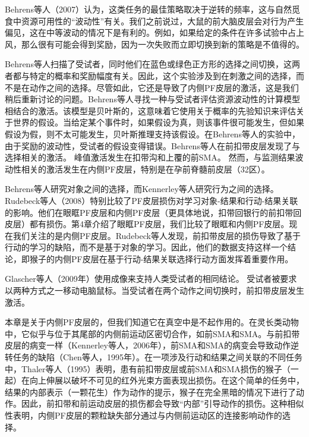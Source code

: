Behrens等人（2007）认为，这类任务的最佳策略取决于逆转的频率，这与自然觅食中资源可用性的“波动性”有关。我们之前说过，大鼠的前大脑皮层会对行为产生偏见，这在中等波动的情况下是有利的。例如，如果给定的条件在许多试验中占上风，那么很有可能会得到奖励，因为一次失败而立即切换到新的策略是不值得的。\par
Behrens等人扫描了受试者，同时他们在蓝色或绿色正方形的选择之间切换，这两者都与特定的概率和奖励幅度有关。因此，这个实验涉及到在刺激之间的选择，而不是在动作之间的选择。尽管如此，它还是导致了内侧PF皮层的激活，这是我们稍后重新讨论的问题。Behrens等人寻找一种与受试者评估资源波动性的计算模型相结合的激活。该模型是贝叶斯的，这意味着它使用关于概率的先验知识来评估关于世界的假设。当给定某个事件时，如果假设为真，则该事件很可能发生，但如果假设为假，则不太可能发生，贝叶斯推理支持该假设。在Behrens等人的实验中，由于奖励的波动性，受试者的假设变得错误。Behrens等人在前扣带皮层发现了与选择相关的激活。
峰值激活发生在扣带沟和上覆的前SMA。
然而，与监测结果波动性相关的激活发生在内侧PF皮层，特别是在孕前脊髓前皮层（32区）。\par
Behrens等人研究对象之间的选择，而Kennerley等人研究行为之间的选择。Rudebeck等人（2008）特别比较了PF皮层损伤对学习对象-结果和行动-结果关联的影响。他们在眼眶PF皮层和内侧PF皮层（更具体地说，扣带回银行的前扣带回皮层）都有损伤。第4章介绍了眼眶PF皮层，我们比较了眼眶和内侧PF皮层。现在我们关注的是内侧PF皮层。Rudebeck等人发现，前扣带皮层的损伤导致了基于行动的学习的缺陷，而不是基于对象的学习。因此，他们的数据支持这样一个结论，即猴子的内侧PF皮层在基于行动-结果关联选择行动方面发挥着重要作用。\par
Glascher等人（2009年）使用成像来支持人类受试者的相同结论。
受试者被要求以两种方式之一移动电脑鼠标。当受试者在两个动作之间切换时，前扣带皮层发生激活。\par
本章是关于内侧PF皮层的，但我们知道它在真空中是不起作用的。在灵长类动物中，它似乎与位于其尾部的内侧前运动区密切合作，如前SMA和SMA。与前扣带皮层的病变一样（Kennerley等人，2006年），前SMA和SMA的病变会导致动作逆转任务的缺陷（Chen等人，1995年）。在一项涉及行动和结果之间关联的不同任务中，Thaler等人（1995）表明，患有前扣带皮层或前SMA和SMA损伤的猴子（一起）在向上伸展以破坏不可见的红外光束方面表现出损伤。在这个简单的任务中，结果的内部表示（一颗花生）作为动作的提示，猴子在完全黑暗的情况下进行了动作。因此，前扣带和前运动皮层的损伤都会导致“内部”引导动作的损伤。这种相似性表明，内侧PF皮层的颗粒缺失部分通过与内侧前运动区的连接影响动作的选择。\par
